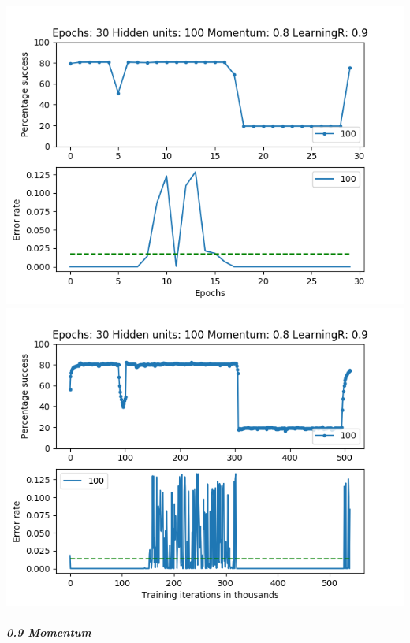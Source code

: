 \documentclass[11pt]{article}
\makeatletter
\def\maxwidth{\ifdim\Gin@nat@width>\linewidth\linewidth
    \else\Gin@nat@width\fi}
\let\Oldincludegraphics\includegraphics
\renewcommand{\includegraphics}[1]{\Oldincludegraphics[width=.8\maxwidth]{#1}}
\makeatother
\begin{document}
\includegraphics{Experiment2/E2_NN_Epoch_Momentum_0.8_30Epochs_100Hiddenunits.png}
\includegraphics{Experiment2/E2_NN_Training_Momentum_0.8_30Epochs_100Hiddenunits.png}

\hypertarget{momentum-9}{%
\subparagraph{0.9 Momentum}\label{momentum-9}}
\end{document}
